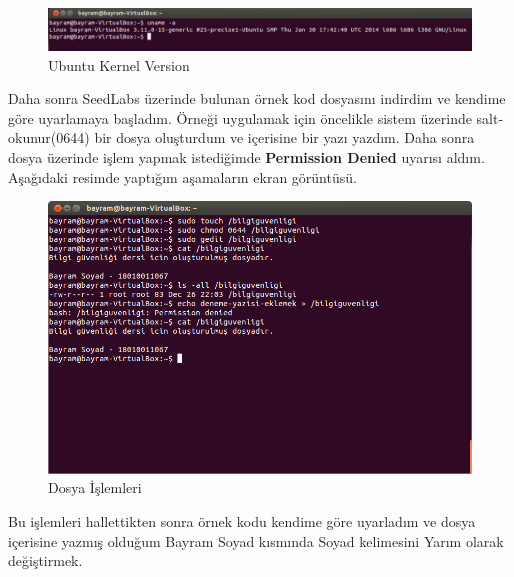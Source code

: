 \documentclass[conference, 12pt, a4paper]{IEEEtran}
\begin{document}
\begin{sloppypar}
    \begin{figure}[htbp]
        \centering
        \includegraphics[scale=0.40]{ubuntu-os-info.png}
        \caption{Ubuntu Kernel Version}
    \end{figure}
    
    Daha sonra SeedLabs üzerinde bulunan örnek kod dosyasını indirdim ve kendime göre uyarlamaya başladım. Örneği uygulamak için öncelikle sistem üzerinde salt-okunur(0644) bir dosya oluşturdum ve içerisine bir yazı yazdım. Daha sonra dosya üzerinde işlem yapmak istediğimde \textbf{Permission Denied} uyarısı aldım. Aşağıdaki resimde yaptığım aşamaların ekran görüntüsü.
    \begin{figure}[htbp]
        \centering
        \includegraphics[scale=0.25]{process1.png}
        \caption{Dosya İşlemleri}
    \end{figure}

    Bu işlemleri hallettikten sonra örnek kodu kendime göre uyarladım ve dosya içerisine yazmış olduğum Bayram Soyad kısmında Soyad kelimesini Yarım olarak değiştirmek.


\end{sloppypar}
\end{document}
